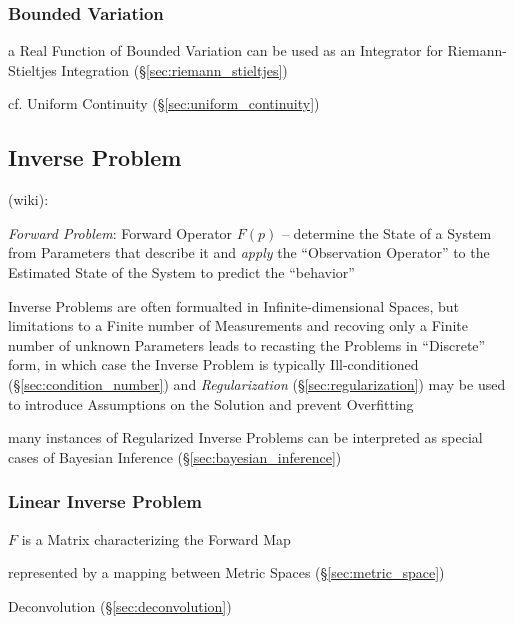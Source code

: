 {\subsubsection{Bounded Variation}\label{sec:bounded_variation}

a Real Function of Bounded Variation can be used as an Integrator for
Riemann-Stieltjes Integration (\S\ref{sec:riemann_stieltjes})

cf. Uniform Continuity (\S\ref{sec:uniform_continuity})



\subsection{Inverse Problem}\label{sec:inverse_problem}


(wiki):

\emph{Forward Problem}: Forward Operator $F(p)$ -- determine the State of a
System from Parameters that describe it and \emph{apply} the ``Observation
Operator'' to the Estimated State of the System to predict the ``behavior''

Inverse Problems are often formualted in Infinite-dimensional Spaces, but
limitations to a Finite number of Measurements and recoving only a Finite number
of unknown Parameters leads to recasting the Problems in ``Discrete'' form, in
which case the Inverse Problem is typically Ill-conditioned
(\S\ref{sec:condition_number}) and \emph{Regularization}
(\S\ref{sec:regularization}) may be used to introduce Assumptions on the
Solution and prevent Overfitting

many instances of Regularized Inverse Problems can be interpreted as special
cases of Bayesian Inference (\S\ref{sec:bayesian_inference})



\subsubsection{Linear Inverse Problem}\label{sec:linear_inverse_problem}

$F$ is a Matrix characterizing the Forward Map

represented by a mapping between Metric Spaces (\S\ref{sec:metric_space})

Deconvolution (\S\ref{sec:deconvolution})



}
